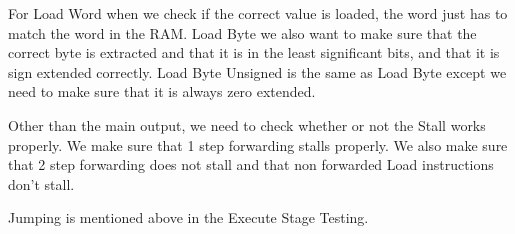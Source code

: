 \documentclass{article}
\begin{document}
For Load Word when we check if the correct value is loaded, the word just has to match the word in the RAM. Load Byte we also want to make sure that the correct byte is extracted and that it is in the least significant bits, and that it is sign extended correctly. Load Byte Unsigned is the same as Load Byte except we need to make sure that it is always zero extended.

Other than the main output, we need to check whether or not the Stall works properly. We make sure that 1 step forwarding stalls properly. We also make sure that 2 step forwarding does not stall and that non forwarded Load instructions don't stall. 

Jumping is mentioned above in the Execute Stage Testing.
\end{document}
